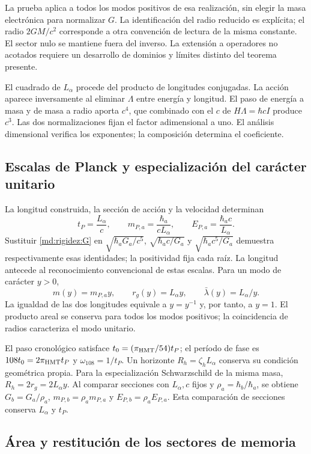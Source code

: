 La prueba aplica a todos los modos positivos de esa realización, sin elegir
la masa electrónica para normalizar $G$. La identificación del radio
reducido es explícita; el radio $2GM/c^2$ corresponde a otra convención
de lectura de la misma constante. El sector nulo se mantiene fuera del
inverso. La extensión a operadores no acotados requiere un desarrollo de
dominios y límites distinto del teorema presente.

El cuadrado de $L_\alpha$ procede del producto de longitudes conjugadas.
La acción aparece inversamente al eliminar $\Lambda$ entre energía y
longitud. El paso de energía a masa y de masa a radio aporta $c^4$,
que combinado con el $c$ de $H\Lambda=\hbar cI$ produce $c^3$.
Las dos normalizaciones fijan el factor adimensional a uno. El análisis
dimensional verifica los exponentes; la composición determina el coeficiente.

\subsection{Escalas de Planck y especialización del carácter unitario}
\label{md:rigidez:escalas}

La longitud construida, la sección de acción y la velocidad determinan
\[
 t_P=\frac{L_\alpha}{c},\qquad
 m_{P,a}=\frac{\hbar_a}{cL_\alpha},\qquad
 E_{P,a}=\frac{\hbar_a c}{L_\alpha}.
\]
Sustituir \eqref{md:rigidez:G} en
$\sqrt{\hbar_aG_a/c^5}$, $\sqrt{\hbar_ac/G_a}$ y
$\sqrt{\hbar_ac^5/G_a}$ demuestra respectivamente esas identidades;
la positividad fija cada raíz. La longitud antecede al reconocimiento
convencional de estas escalas.
Para un modo de carácter $y>0$,
\[
 m(y)=m_{P,a}y,\qquad r_g(y)=L_\alpha y,\qquad
 \bar\lambda(y)=L_\alpha/y.
\]
La igualdad de las dos longitudes equivale a $y=y^{-1}$ y, por tanto,
a $y=1$. El producto areal se conserva para todos los modos positivos;
la coincidencia de radios caracteriza el modo unitario.

El paso cronológico satisface $t_0=(\pi_{\rm HMT}/54)t_P$;
el período de fase es $108t_0=2\pi_{\rm HMT}t_P$ y
$\omega_{108}=1/t_P$. Un horizonte $R_h=\zeta_hL_\alpha$ conserva
su condición geométrica propia. Para la especialización Schwarzschild
de la misma masa, $R_h=2r_g=2L_\alpha y$.
Al comparar secciones con $L_\alpha,c$ fijos y
$\rho_a=\hbar_b/\hbar_a$, se obtiene
$G_b=G_a/\rho_a$, $m_{P,b}=\rho_a m_{P,a}$ y
$E_{P,b}=\rho_a E_{P,a}$. Esta comparación de secciones conserva
$L_\alpha$ y $t_P$.

\subsection{Área y restitución de los sectores de memoria}
\label{md:rigidez:area}

